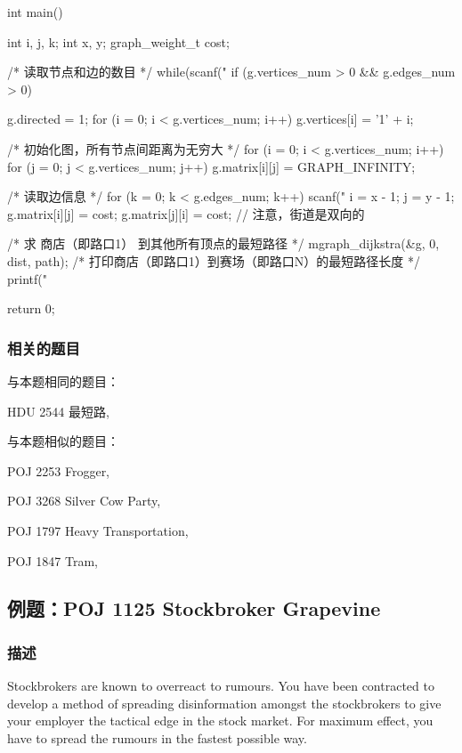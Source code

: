 \begin{Codex}[label=hdu_2544.c]
int main() {
    int i, j, k;
    int x, y;
    graph_weight_t cost;

    /* 读取节点和边的数目 */
    while(scanf("%
        if (g.vertices_num > 0 && g.edges_num > 0){
        g.directed = 1;
        for (i = 0; i < g.vertices_num; i++) g.vertices[i] = '1' + i;

        /* 初始化图，所有节点间距离为无穷大 */
        for (i = 0; i < g.vertices_num; i++) {
            for (j = 0; j < g.vertices_num; j++) {
                g.matrix[i][j] = GRAPH_INFINITY;
            }
        }

        /* 读取边信息 */
        for (k = 0; k < g.edges_num; k++) {
            scanf("%
            i = x - 1;
            j = y - 1;
            g.matrix[i][j] = cost;
            g.matrix[j][i] = cost;  // 注意，街道是双向的
        }

        /* 求 商店（即路口1） 到其他所有顶点的最短路径 */
        mgraph_dijkstra(&g, 0, dist, path);
        /* 打印商店（即路口1）到赛场（即路口N）的最短路径长度 */
        printf("%
    }
    return 0;
}
\end{Codex}

\subsubsection{相关的题目}
与本题相同的题目：
\begindot
\item HDU 2544 最短路, 
\myenddot

与本题相似的题目：
\begindot
\item POJ 2253 Frogger, 
\item POJ 3268 Silver Cow Party, 
\item POJ 1797 Heavy Transportation, 
\item POJ 1847 Tram, 
\myenddot


\subsection{例题：POJ 1125 Stockbroker Grapevine}
\subsubsection{描述}
Stockbrokers are known to overreact to rumours. You have been contracted to develop a method of spreading disinformation amongst the stockbrokers to give your employer the tactical edge in the stock market. For maximum effect, you have to spread the rumours in the fastest possible way. 

